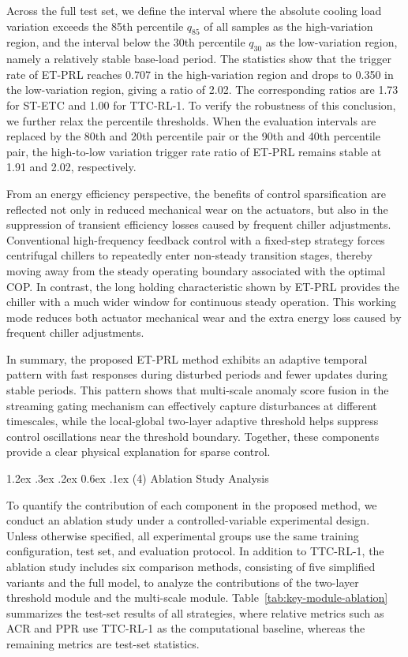 \documentclass[preprint,12pt,number]{elsarticle}
\makeatletter
\renewcommand\paragraph{\@startsection{paragraph}{4}{\z@}%
  {1.2ex \@plus .3ex \@minus .2ex}%
  {0.6ex \@plus .1ex}%
  {\normalfont\normalsize}}
\makeatother
\begin{document}
Across the full test set, we define the interval where the absolute cooling load variation exceeds the 85th percentile \(q_{85}\) of all samples as the high-variation region, and the interval below the 30th percentile \(q_{30}\) as the low-variation region, namely a relatively stable base-load period. The statistics show that the trigger rate of ET-PRL reaches 0.707 in the high-variation region and drops to 0.350 in the low-variation region, giving a ratio of 2.02. The corresponding ratios are 1.73 for ST-ETC and 1.00 for TTC-RL-1. To verify the robustness of this conclusion, we further relax the percentile thresholds. When the evaluation intervals are replaced by the 80th and 20th percentile pair or the 90th and 40th percentile pair, the high-to-low variation trigger rate ratio of ET-PRL remains stable at 1.91 and 2.02, respectively.

From an energy efficiency perspective, the benefits of control sparsification are reflected not only in reduced mechanical wear on the actuators, but also in the suppression of transient efficiency losses caused by frequent chiller adjustments. Conventional high-frequency feedback control with a fixed-step strategy forces centrifugal chillers to repeatedly enter non-steady transition stages, thereby moving away from the steady operating boundary associated with the optimal COP. In contrast, the long holding characteristic shown by ET-PRL provides the chiller with a much wider window for continuous steady operation. This working mode reduces both actuator mechanical wear and the extra energy loss caused by frequent chiller adjustments.

In summary, the proposed ET-PRL method exhibits an adaptive temporal pattern with fast responses during disturbed periods and fewer updates during stable periods. This pattern shows that multi-scale anomaly score fusion in the streaming gating mechanism can effectively capture disturbances at different timescales, while the local-global two-layer adaptive threshold helps suppress control oscillations near the threshold boundary. Together, these components provide a clear physical explanation for sparse control.

\paragraph{(4) Ablation Study Analysis}\label{ablation-study-analysis}

To quantify the contribution of each component in the proposed method, we conduct an ablation study under a controlled-variable experimental design. Unless otherwise specified, all experimental groups use the same training configuration, test set, and evaluation protocol. In addition to TTC-RL-1, the ablation study includes six comparison methods, consisting of five simplified variants and the full model, to analyze the contributions of the two-layer threshold module and the multi-scale module. Table~\ref{tab:key-module-ablation} summarizes the test-set results of all strategies, where relative metrics such as ACR and PPR use TTC-RL-1 as the computational baseline, whereas the remaining metrics are test-set statistics.
\end{document}
